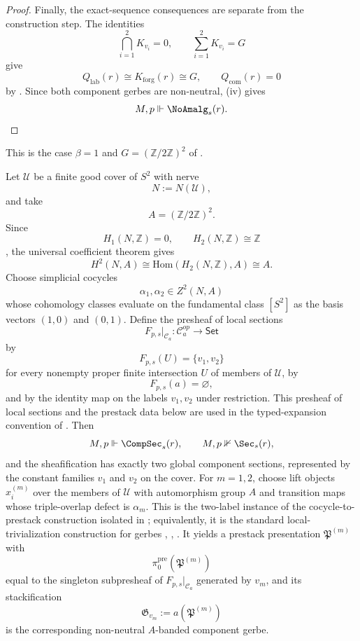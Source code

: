 \begin{proof}
Finally, the exact-sequence consequences are separate from the construction step. The identities
\[
\bigcap_{i=1}^2 K_{v_i}=0,
\qquad
\sum_{i=1}^2 K_{v_i}=G
\]
give
\[
Q_{\mathrm{lab}}(r)\cong K_{\mathrm{forg}}(r)\cong G,
\qquad
Q_{\mathrm{com}}(r)=0
\]
by . Since both component gerbes are non-neutral, (iv) gives
\[
M,p\Vdash \NoAmalg_s(r).
\]
\end{proof}

\begin{example}\label{ex:two-branch-sphere-separation}
This is the case $\beta=1$ and $G=(\mathbb Z/2\mathbb Z)^2$ of .

Let $\mathcal U$ be a finite good cover of $S^2$ with nerve
\[
N:=N(\mathcal U),
\]
and take
\[
A=(\mathbb Z/2\mathbb Z)^2.
\]
Since
\[
H_1(N,\mathbb Z)=0,
\qquad
H_2(N,\mathbb Z)\cong \mathbb Z
\]
\cite[Secs.~2.1, 2.2]{Hatcher2002}, the universal coefficient theorem gives
\[
H^2(N,A)\cong \mathrm{Hom}(H_2(N,\mathbb Z),A)\cong A.
\]
Choose simplicial cocycles
\[
\alpha_1,\alpha_2\in Z^2(N,A)
\]
whose cohomology classes evaluate on the fundamental class $[S^2]$ as the basis vectors $(1,0)$ and $(0,1)$. Define the presheaf of local sections
\[
F_{p,s}|_{\mathcal C_a}:\mathcal C_a^{op}\to\mathsf{Set}
\]
by
\[
F_{p,s}(U)=\{v_1,v_2\}
\]
for every nonempty proper finite intersection $U$ of members of $\mathcal U$, by
\[
F_{p,s}(a)=\varnothing,
\]
and by the identity map on the labels $v_1,v_2$ under restriction. This presheaf
of local sections and the prestack data below are used in the typed-expansion
convention of . Then
\[
M,p\Vdash \CompSec_s(r),
\qquad
M,p\nVdash \Sec_s(r),
\]
and the sheafification has exactly two global component sections, represented by the constant families $v_1$ and $v_2$ on the cover. For $m=1,2$, choose lift objects $x_i^{(m)}$ over the members of $\mathcal U$ with automorphism group $A$ and transition maps whose triple-overlap defect is $\alpha_m$. This is the two-label instance of the cocycle-to-prestack construction isolated in ; equivalently, it is the standard local-trivialization construction for gerbes \cite[Chap.~IV]{Giraud1971}, \cite[Sec.~5]{Breen2006}, \cite{Murray1996}. It yields a prestack presentation $\mathfrak P^{(m)}$ with
\[
\pi_0^{\mathrm{pre}}(\mathfrak P^{(m)})
\]
equal to the singleton subpresheaf of $F_{p,s}|_{\mathcal C_a}$ generated by $v_m$, and its stackification
\[
\mathfrak G_{v_m}:=a(\mathfrak P^{(m)})
\]
is the corresponding non-neutral $A$-banded component gerbe.


\end{example}
